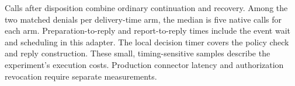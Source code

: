 Calls after disposition combine ordinary continuation and recovery. Among the two matched denials per delivery-time arm, the median is five native calls for each arm. Preparation-to-reply and report-to-reply times include the event wait and scheduling in this adapter. The local decision timer covers the policy check and reply construction. These small, timing-sensitive samples describe the experiment's execution costs. Production connector latency and authorization revocation require separate measurements.
